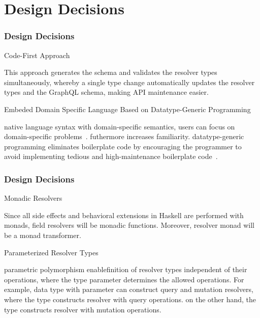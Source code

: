 
\section{Design Decisions} 

\begin{frame}\frametitle{Design Decisions}
\begin{alertblock}{Code-First Approach}  

This approach generates the schema and validates the resolver types simultaneously, whereby a single type change automatically updates the resolver types and the GraphQL schema, making API maintenance easier.

\end{alertblock}

\begin{alertblock}{Embeded Domain Specific Language Based on Datatype-Generic Programming}  

native language syntax with domain-specific semantics, users can focus on domain-specific problems~\cite{edsl-modeling}. futhermore increases familiarity. datatype-generic programming eliminates boilerplate code by encouraging the programmer to avoid implementing tedious and high-maintenance boilerplate code~\cite{scrap-your-boilerplate}.

\end{alertblock}

\end{frame}

\begin{frame}\frametitle{Design Decisions}

\begin{alertblock}{Monadic Resolvers} 

Since all side effects and behavioral extensions in Haskell are performed with monads, field resolvers will be monadic functions. 
Moreover, resolver monad will be a monad transformer. 

\end{alertblock}


\begin{alertblock}{Parameterized Resolver Types}

parametric polymorphism enablefinition of resolver types independent of their operations, where the type parameter determines the allowed operations. For example,  data type  with parameter  can construct query and mutation resolvers, where the type  constructs resolver  with query operations. on the other hand, the type  constructs resolver  with mutation operations.

\end{alertblock}
\end{frame}
